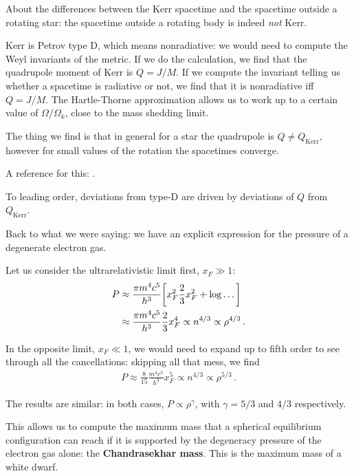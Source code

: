 \documentclass[main.tex]{subfiles}
\begin{document}

About the differences between the Kerr spacetime and the spacetime outside a rotating star: the spacetime outside a rotating body is indeed \emph{not} Kerr. 

Kerr is Petrov type D, which means nonradiative: we would need to compute the Weyl invariants of the metric. 
If we do the calculation, we find that the quadrupole moment of Kerr is \(Q = J / M\). 
If we compute the invariant telling us whether a spacetime is radiative or not, we find that it is nonradiative iff \(Q = J / M\). 
The Hartle-Thorne approximation allows us to work up to a certain value of \(\Omega / \Omega _k\), close to the mass shedding limit.

The thing we find is that in general for a star the quadrupole is \(Q \neq Q _{\text{Kerr}}\), however for small values of the rotation the spacetimes converge. 

A reference for this: \textcite{bertiRotatingNeutronStars2005}. 

To leading order, deviations from type-D are driven by deviations of \(Q \) from \(Q _{\text{Kerr}}\). 

Back to what we were saying: we have an explicit expression for the pressure of a degenerate electron gas. 

Let us consider the ultrarelativistic limit first, \(x_F \gg 1\): 
%
\begin{align}
P &\approx \frac{\pi m^4 c^{5}}{h^3}
\qty[x_F^2 \frac{2}{3} x_F^2 + \log \dots]  \\
&\approx \frac{\pi m^4 c^{5}}{h^3} \frac{2}{3} x_F^{4} \propto n^{4/3} \propto \rho^{4/3}
\,.
\end{align}

In the opposite limit, \(x_F \ll 1\), we would need to expand up to fifth order to see through all the cancellations: skipping all that mess, we find
%
\begin{align}
P \approx \frac{8}{15} \frac{m^4 c^5}{h^3} x_F^{5} \propto n^{4/3}  \propto \rho^{5/3}
\,.
\end{align}

The results are similar: in both cases, \(P \propto \rho^{\gamma }\), with \(\gamma = 5/3\) and \(4/3\) respectively.

This allows us to compute the maximum mass that a spherical equilibrium configuration can reach if it is supported by the degeneracy pressure of the electron gas alone: the \textbf{Chandrasekhar mass}.
This is the maximum mass of a white dwarf. 
\end{document}

